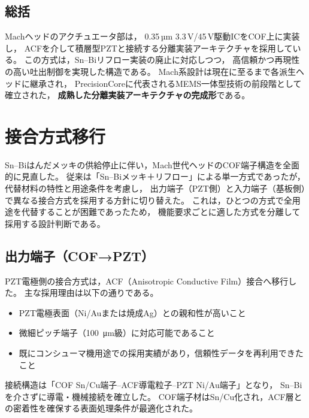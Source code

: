 \documentclass[conference]{IEEEtran}
\begin{document}
\subsection{総括}

Machヘッドのアクチュエータ部は，
0.35\,µm 3.3\,V/45\,V駆動ICをCOF上に実装し，
ACFを介して積層型PZTと接続する分離実装アーキテクチャを採用している。  
この方式は，Sn–Biリフロー実装の廃止に対応しつつ，
高信頼かつ再現性の高い吐出制御を実現した構造である。  
Mach系設計は現在に至るまで各派生ヘッドに継承され，
PrecisionCoreに代表されるMEMS一体型技術の前段階として確立された，
\textbf{成熟した分離実装アーキテクチャの完成形}である。

\section{接合方式移行}

Sn–Biはんだメッキの供給停止に伴い，Mach世代ヘッドのCOF端子構造を全面的に見直した。  
従来は「Sn–Biメッキ＋リフロー」による単一方式であったが，  
代替材料の特性と用途条件を考慮し，  
出力端子（PZT側）と入力端子（基板側）で異なる接合方式を採用する方針に切り替えた。  
これは，ひとつの方式で全用途を代替することが困難であったため，  
機能要求ごとに適した方式を分離して採用する設計判断である。

\subsection{出力端子（COF→PZT）}

PZT電極側の接合方式は，ACF（Anisotropic Conductive Film）接合へ移行した。  
主な採用理由は以下の通りである。

\begin{itemize}
  \item PZT電極表面（Ni/Auまたは焼成Ag）との親和性が高いこと  
  \item 微細ピッチ端子（\SI{100}{\micro m}級）に対応可能であること  
  \item 既にコンシューマ機用途での採用実績があり，信頼性データを再利用できたこと
\end{itemize}

接続構造は「COF Sn/Cu端子–ACF導電粒子–PZT Ni/Au端子」となり，  
Sn–Biを介さずに導電・機械接続を確立した。  
COF端子材はSn/Cu化され，ACF層との密着性を確保する表面処理条件が最適化された。
\end{document}
